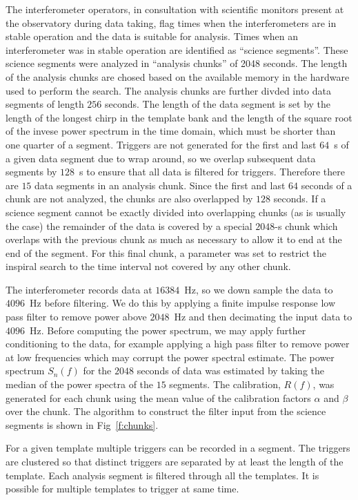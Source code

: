 The interferometer operators, in consultation with scientific monitors present
at the observatory during data taking, flag times when the interferometers are
in stable operation and the data is suitable for analysis.  Times when an
interferometer was in stable operation are identified as ``science segments''.
These science segments were analyzed in ``analysis chunks'' of 2048 seconds.
The length of the analysis chunks are chosed based on the available memory in
the hardware used to perform the search.  The analysis chunks are further
divded into data segments of length $256$ seconds. The length of the data
segment is set by the length of the longest chirp in the template bank and the
length of the square root of the invese power spectrum in the time domain,
which must be shorter than one quarter of a segment.  Triggers are not
generated for the first and last $64$~s of a given data segment due to wrap
around, so we overlap subsequent data segments by $128$~s to ensure that all
data is filtered for triggers. Therefore there are $15$ data segments in an
analysis chunk. Since the first and last $64$ seconds of a chunk are not
analyzed, the chunks are also overlapped by $128$ seconds.  If a science
segment cannot be exactly divided into overlapping chunks (as is usually the
case) the remainder of the data is covered by a special $2048$-s chunk which
overlaps with the previous chunk as much as necessary to allow it to end at
the end of the segment.  For this final chunk, a parameter was set to restrict
the inspiral search to the time interval not covered by any other chunk. 

The interferometer records data at $16384$~Hz, so we down sample the data to
$4096$~Hz before filtering. We do this by applying a finite impulse response
low pass filter to remove power above $2048$~Hz and then decimating the input
data to $4096$~Hz. Before computing the power spectrum, we may apply further
conditioning to the data, for example applying a high pass filter to remove
power at low frequencies which may corrupt the power spectral estimate.  The
power spectrum $S_n(f)$ for the $2048$ seconds of data was estimated by taking
the median of the power spectra of the $15$ segments.  The calibration,
$R(f)$, was generated for each chunk using the mean value of the calibration
factors $\alpha$ and $\beta$ over the chunk.  The algorithm to construct the
filter input from the science segments is shown in Fig~\ref{f:chunks}.

For a given template multiple triggers can be recorded in a segment.  The
triggers are clustered so that distinct triggers are separated by at least the
length of the template.  Each analysis segment is filtered through all the
templates. It is possible for multiple templates to trigger at same time.

